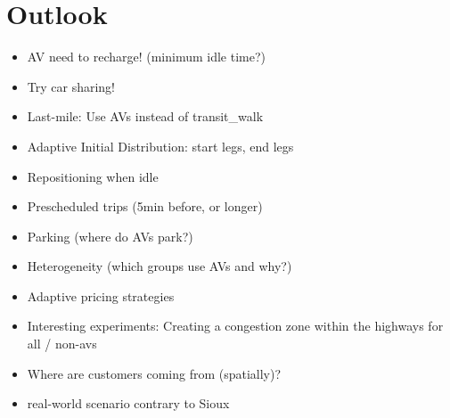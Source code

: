 \section{Outlook}

\begin{itemize}
\item AV need to recharge! \citep{Chen2015} (minimum idle time?)
\item Try car sharing!
\item Last-mile: Use AVs instead of transit\_walk
\item Adaptive Initial Distribution: start legs, end legs
\item Repositioning when idle
\item Prescheduled trips (5min before, or longer)
\item Parking (where do AVs park?)
\item Heterogeneity (which groups use AVs and why?)
\item Adaptive pricing strategies \citep{Chen16}
\item Interesting experiments: Creating a congestion zone within the highways for all / non-avs
\item Where are customers coming from (spatially)?
\item real-world scenario contrary to Sioux
\end{itemize}

